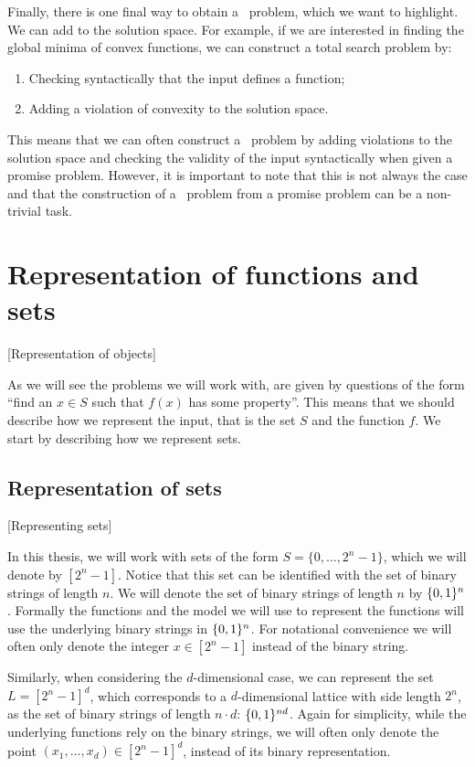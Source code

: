Finally, there is one final way to obtain a \TFNP\ problem, which we want to highlight. We can add  to the solution space. For example, if we are interested in finding the global minima of convex functions, we can construct a total search problem by:
\begin{enumerate}
    \item Checking syntactically that the input defines a function;
    \item Adding a violation of convexity to the solution space.
\end{enumerate}

This means that we can often construct a \TFNP\ problem by adding violations to the solution space and checking the validity of the input syntactically when given a promise problem. However, it is important to note that this is not always the case and that the construction of a \TFNP\ problem from a promise problem can be a non-trivial task.

\section{Representation of functions and sets}[Representation of objects]

As we will see the problems we will work with, are given by questions of the form ``find an $x \in S$ such that $f(x)$ has some property''. This means that we should describe how we represent the input, that is the set $S$ and the function $f$. We start by describing how we represent sets.

\subsection{Representation of sets}[Representing sets]

In this thesis, we will work with sets of the form $S = \{0, \dots, 2^n - 1\}$, which we will denote by $[2^n - 1]$. Notice that this set can be identified with the set of binary strings of length $n$. We will denote the set of binary strings of length $n$ by $\{0, 1\}^n$. Formally the functions and the model we will use to represent the functions will use the underlying binary strings in $\{0, 1\}^n$. For notational convenience we will often only denote the integer $x \in [2^n - 1]$ instead of the binary string.

Similarly, when considering the $d$-dimensional case, we can represent the set $L = [2^n - 1]^d$, which corresponds to a $d$-dimensional lattice with side length $2^n$, as the set of binary strings of length $n \cdot d$: $\{0, 1\}^{nd}$. Again for simplicity, while the underlying functions rely on the binary strings, we will often only denote the point $(x_1, \dots, x_d) \in [2^n - 1]^d$, instead of its binary representation.

